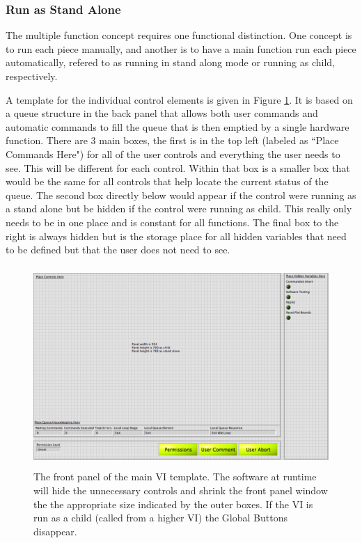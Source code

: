 \subsubsection{Run as Stand Alone}

The multiple function concept requires one functional distinction. One concept is to run each piece manually, and another is to have a main function run each piece automatically, refered to as running in stand along mode or running as child, respectively.   

A template for the individual control elements is given in Figure \ref{Fig:VITemplate}. It is based on a queue structure in the back panel that allows both user commands and automatic commands to fill the queue that is then emptied by a single hardware function. There are 3 main boxes, the first is in the top left (labeled as ``Place Commands Here") for all of the user controls and everything the user needs to see. This will be different for each control. Within that box is a smaller box that would be the same for all controls that help locate the current status of the queue. The second box directly below would appear if the control were running as a stand alone but be hidden if the control were running as child. This really only needs to be in one place and is constant for all functions. The final box to the right is always hidden but is the storage place for all hidden variables that need to be defined but that the user does not need to see. 

\begin{figure}[!h]\centering
\includegraphics[height=3in]{Figures/MainVITemplate}
\caption{The front panel of the main VI template. The software at runtime will hide the unnecessary controls and shrink the front panel window the the appropriate size indicated by the outer boxes. If the VI is run as a child (called from a higher VI) the Global Buttons disappear. }\label{Fig:VITemplate}
\end{figure}

